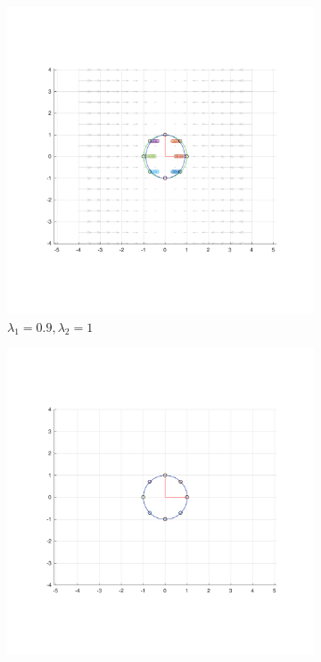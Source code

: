 \documentclass[]{article}
\begin{document}
\begin{figure}[H]
	\centering
	\begin{subfigure}{.5\textwidth}
		\centering
		\includegraphics[width=0.99\linewidth]{const_9}
		\caption{$\lambda_1 = 0.9, \lambda_2 = 1 $}
		\label{fig:const1}
	\end{subfigure}
	\begin{subfigure}{.5\textwidth}
		\centering
		\includegraphics[width=0.99\linewidth]{const_10}

\end{subfigure}
\end{figure}
\end{document}

